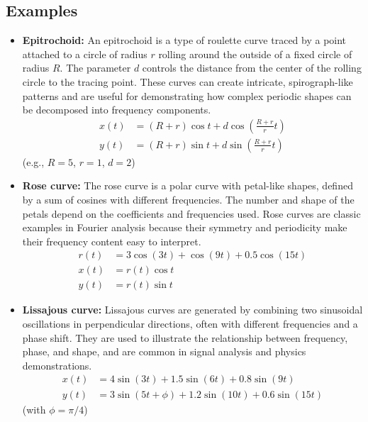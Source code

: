 \documentclass[11pt,a4paper]{article}
\begin{document}
\subsection{Examples}

\begin{itemize}
    \item \textbf{Epitrochoid:} An epitrochoid is a type of roulette curve traced by a point attached to a circle of radius $r$ rolling around the outside of a fixed circle of radius $R$. The parameter $d$ controls the distance from the center of the rolling circle to the tracing point. These curves can create intricate, spirograph-like patterns and are useful for demonstrating how complex periodic shapes can be decomposed into frequency components.
    \begin{align}
        x(t) &= (R + r) \cos t + d \cos\left(\frac{R + r}{r} t\right) \\
        y(t) &= (R + r) \sin t + d \sin\left(\frac{R + r}{r} t\right)
    \end{align}
    (e.g., $R=5$, $r=1$, $d=2$)

    \item \textbf{Rose curve:} The rose curve is a polar curve with petal-like shapes, defined by a sum of cosines with different frequencies. The number and shape of the petals depend on the coefficients and frequencies used. Rose curves are classic examples in Fourier analysis because their symmetry and periodicity make their frequency content easy to interpret.
    \begin{align}
        r(t) &= 3\cos(3t) + \cos(9t) + 0.5\cos(15t) \\
        x(t) &= r(t)\cos t \\
        y(t) &= r(t)\sin t
    \end{align}

    \item \textbf{Lissajous curve:} Lissajous curves are generated by combining two sinusoidal oscillations in perpendicular directions, often with different frequencies and a phase shift. They are used to illustrate the relationship between frequency, phase, and shape, and are common in signal analysis and physics demonstrations.
    \begin{align}
        x(t) &= 4\sin(3t) + 1.5\sin(6t) + 0.8\sin(9t) \\
        y(t) &= 3\sin(5t + \phi) + 1.2\sin(10t) + 0.6\sin(15t)
    \end{align}
    (with $\phi = \pi/4$)


\end{itemize}
\end{document}
